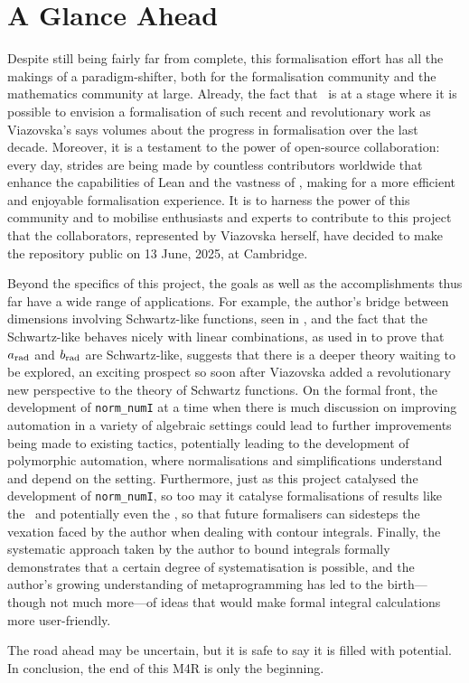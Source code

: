 \section{A Glance Ahead}

Despite still being fairly far from complete, this formalisation effort has all the makings of a paradigm-shifter, both for the formalisation community and the mathematics community at large. Already, the fact that \mathlib\ is at a stage where it is possible to envision a formalisation of such recent and revolutionary work as Viazovska's says volumes about the progress in formalisation over the last decade. Moreover, it is a testament to the power of open-source collaboration: every day, strides are being made by countless contributors worldwide that enhance the capabilities of Lean and the vastness of \mathlib, making for a more efficient and enjoyable formalisation experience. It is to harness the power of this community and to mobilise enthusiasts and experts to contribute to this project that the collaborators, represented by Viazovska herself, have decided to make the repository public on 13 June, 2025, at Cambridge.

Beyond the specifics of this project, the goals as well as the accomplishments thus far have a wide range of applications. For example, the author's bridge between dimensions involving Schwartz-like functions, seen in , and the fact that the Schwartz-like behaves nicely with linear combinations, as used in  to prove that $a_{\operatorname{rad}}$ and $b_{\operatorname{rad}}$ are Schwartz-like, suggests that there is a deeper theory waiting to be explored, an exciting prospect so soon after Viazovska added a revolutionary new perspective to the theory of Schwartz functions. On the formal front, the development of \lstinline|norm_numI| at a time when there is much discussion on improving automation in a variety of algebraic settings could lead to further improvements being made to existing tactics, potentially leading to the development of polymorphic automation, where normalisations and simplifications understand and depend on the setting. Furthermore, just as this project catalysed the development of \lstinline|norm_numI|, so too may it catalyse formalisations of results like the \CGT\ and potentially even the \JCT, so that future formalisers can sidesteps the vexation faced by the author when dealing with contour integrals. Finally, the systematic approach taken by the author to bound integrals formally demonstrates that a certain degree of systematisation is possible, and the author's growing understanding of metaprogramming has led to the birth---though not much more---of ideas that would make formal integral calculations more user-friendly.

The road ahead may be uncertain, but it is safe to say it is filled with potential. In conclusion, the end of this M4R is only the beginning.
